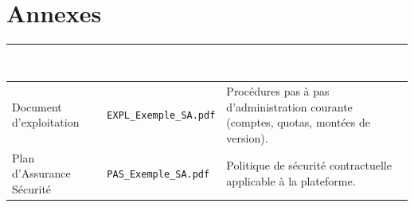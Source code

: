 \documentclass[11pt,a4paper]{report}
\newcommand{\tblhead}[1]{\textcolor{white}{\textbf{#1}}}
\begin{document}
\chapter{Annexes}
\begin{longtable}{|p{4cm}|p{4cm}|p{5.5cm}|}
\hline
\rowcolor{primary}\tblhead{Nom du document} & \tblhead{Nom du fichier} & \tblhead{Description} \\
\hline
\endhead
Document d'exploitation & \texttt{EXPL\_Exemple\_SA.\allowbreak{}pdf} & Procédures pas à pas d'administration courante (comptes, quotas, montées de version).\allowbreak{} \\
\hline
Plan d'Assurance Sécurité & \texttt{PAS\_Exemple\_SA.\allowbreak{}pdf} & Politique de sécurité contractuelle applicable à la plateforme.\allowbreak{} \\
\hline
\end{longtable}
\end{document}
